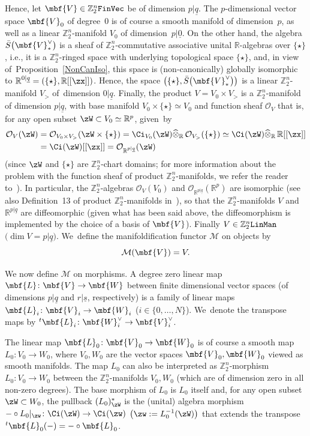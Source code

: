 \documentclass[pdftex]{sigma}%
\newcommand{\op}[1]{\operatorname{#1}}
\newcommand{\R}{{\mathbb R}}
\newcommand{\Z}{{\mathbb Z}}
\def\ul{\underline}
\def\cM{\cal M}
\def\cO{\mathcal{O}}
\def\cM{\mathcal{M}}
\def\ul{\underline}
\newcommand{\0}{\otimes}
\numberwithin{equation}{section}
\begin{document}
Hence, let $\mbf{V}\in\Z_2^n\tt FinVec$ be of dimension $p|\ul q$. The $p$-dimensional vector space $\mbf{V}_0$ of degree~$0$ is of course a smooth manifold of dimension~$p$, as well as a linear $\Z_2^n$-manifold $V_0$ of dimension~$p|\ul 0$. On the other hand, the algebra $\bar{S}\big(\mbf{V}^\vee_*\big)$ is a sheaf of $\Z_2^n$-commutative associative unital $\R$-algebras over $\{\star\}$, i.e., it is a $\Z_2^n$-ringed space with underlying topological space $\{\star\}$, and, in view of~Proposition~\ref{NonCanIso}, this space is (non-canonically) globally isomorphic to $\R^{0|\ul q}=(\{\star\},\R[[\zx]])$. Hence, the space $\big(\{\star\},\bar{S}\big(\mbf{V}_*^\vee\big)\big)$ is a linear $\Z_2^n$-manifold $V_>$ of~dimension $0|\ul q$. Finally, the product $V=V_0\times V_>$ is a $\Z_2^n$-manifold of dimension $p|\ul q$, with base manifold $V_0\times\{\star\}\simeq V_0$ and function sheaf $\cO_{V}$ that is, for any open subset $\zW\subset V_0\simeq \R^p$, given~by
\begin{align}
\cO_V(\zW)&=\cO_{V_0\times V_>}(\zW\times\{\star\})= \Ci_{V_0}(\zW)\widehat{\0}_\R\,\cO_{V_>}(\{\star\})\simeq \Ci(\zW)\widehat{\0}_\R\,\R[[\zx]]\nonumber
\\
&= \Ci(\zW)[[\zx]]=\cO_{\R^{p|\ul q}}(\zW)\label{FunShV}
\end{align}
(since $\zW$ and $\{\star\}$ are $\Z_2^n$-chart domains; for more information about the problem with the function sheaf of product $\Z_2^n$-manifolds, we refer the reader to~\cite{Bruce:2019}). In particular, the $\Z_2^n$-algebras $\cO_V(V_0)$ and $\cO_{\R^{p|\ul q}}(\R^p)$ are isomorphic (see also Definition~13 of product $\Z_2^n$-manifolds in~\cite{Bruce:2019}), so that the $\Z_2^n$-manifolds $V$ and $\R^{p|\ul q}$ are diffeomorphic (given what has been said above, the diffeomorphism is implemented by the choice of a basis of $\mbf{V}$). Finally $V\in\Z_2^n\tt LinMan$ $\big(\op{dim} V=p|\ul q\big)$. We~define the manifoldification functor $\cM$ on objects by
\[%
\cM(\mbf{V})=V.
\]

We now define $\cM$ on morphisms. A degree zero linear map $\mbf{L}\colon \mbf{V}\to\mbf{W}$ between finite dimensional vector spaces (of dimensions $p|\ul q$ and $r|\ul s$, respectively) is a family of linear maps $\mbf{L}_i\colon \mbf{V}_i\to\mbf{W}_i$ ($i\in\{0,\dots, N\}$). We~denote the transpose maps by $^t\mbf{L}_i\colon \mbf{W}_i^\vee\to \mbf{V}_i^\vee$.

The linear map $\mbf{L}_0\colon \mbf{V}_0\to\mbf{W}_0$ is of course a smooth map $L_0\colon V_0\to W_0$, where $V_0,W_0$ are the vector spaces $\mbf{V}_0,\mbf{W}_0$ viewed as smooth manifolds. The map $L_0$ can also be interpreted as $\Z_2^n$-morphism $L_0\colon V_0\to W_0$ between the $\Z_2^n$-manifolds $V_0,W_0$ (which are of dimension zero in all non-zero degrees). The base morphism of $L_0$ is $L_0$ itself and, for any open subset $\zW\subset W_0$, the pullback $(L_0)^*_\zW$ is the (unital) algebra morphism $-\circ L_0|_\zw\colon \Ci(\zW)\to \Ci(\zw)$ $\big(\zw:=L_0^{-1}(\zW)\big)$ that extends the transpose $^t\mbf{L}_0(-)= -\circ \mbf{L}_0$.
\end{document}
